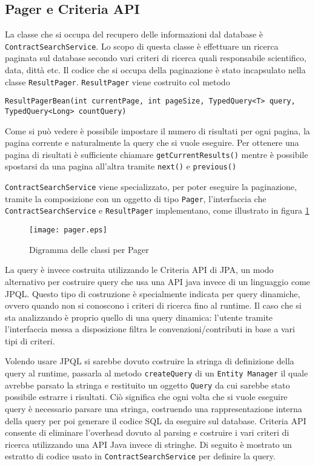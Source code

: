 \subsection{Pager e Criteria API}

La classe che si occupa del recupero delle informazioni dal database è \texttt{ContractSearchService}. Lo scopo di questa classe è effettuare un ricerca paginata sul database secondo vari criteri di ricerca quali 
responsabile scientifico, data, dittà etc. Il codice che si occupa della paginazione è stato incapsulato nella classe \texttt{ResultPager}. \texttt{ResultPager} viene costruito
col metodo

\lstinline{ResultPagerBean(int currentPage, int pageSize, TypedQuery<T> query, TypedQuery<Long> countQuery)}

Come si può vedere è possibile impostare il numero di risultati per ogni pagina, la pagina corrente e naturalmente la query che si vuole eseguire. Per ottenere una pagina di risultati è sufficiente chiamare \lstinline{getCurrentResults()}
mentre è possibile spostarsi da una pagina all'altra tramite \lstinline{next()} e \lstinline{previous()}

\texttt{ContractSearchService} viene specializzato, per poter eseguire la paginazione, tramite la composizione con un oggetto di tipo \texttt{Pager}, l'interfaccia che \texttt{ContractSearchService} e \texttt{ResultPager} implementano, come
illustrato in figura \ref{pager}


\begin{figure}[h]
  \caption{Digramma delle classi per Pager}
  \label{pager}
  \centering
    \texttt{[image: pager.eps]}
\end{figure}

La query è invece costruita utilizzando le Criteria API di JPA, un modo alternativo per costruire query che usa una API java invece di un linguaggio
come JPQL. Questo tipo di costruzione è specialmente indicata per query dinamiche, ovvero quando non si conoscono i criteri di ricerca fino al runtime.
Il caso che si sta analizzando è proprio quello di una query dinamica: l'utente tramite l'interfaccia messa a disposizione filtra le convenzioni/contributi
in base a vari tipi di criteri.

Volendo usare JPQL si sarebbe dovuto costruire la stringa di definizione della query al runtime, passarla al metodo \lstinline{createQuery} di un
\texttt{Entity Manager} il quale avrebbe parsato la stringa e restituito un oggetto \texttt{Query} da cui sarebbe stato possibile estrarre i risultati.
Ciò significa che ogni volta che si vuole eseguire query è necessario parsare una stringa, costruendo una rappresentazione interna della query per poi generare il codice SQL da
eseguire sul database. Criteria API consente di eliminare l'overhead dovuto al parsing e costruire i vari criteri di ricerca utilizzando una API Java invece
di stringhe. Di seguito è mostrato un estratto di codice usato in \texttt{ContractSearchService} per definire la query.


